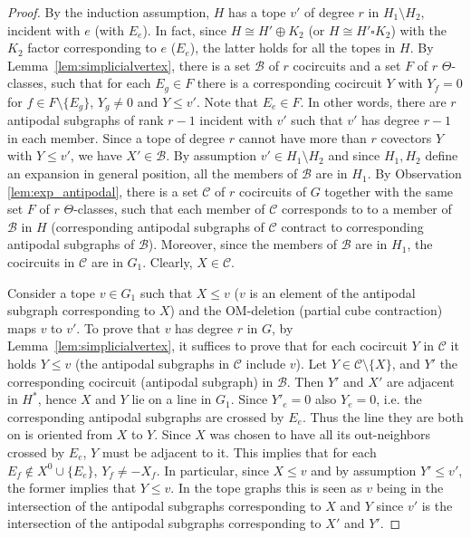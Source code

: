\documentclass[final,11pt]{article}
\begin{document}
\begin{proof}
By the induction assumption, $H$ has a tope $v'$ of degree $r$ in $H_1 \setminus H_2$, incident with $e$ (with $E_e$). In fact, since $H\cong H' \oplus K_2$ (or $H\cong H' \square K_2$) with the $K_2$ factor corresponding to $e$ ($E_e$), the latter holds for all the topes in $H$. By Lemma~\ref{lem:simplicialvertex}, there is a set $\mathcal{B}$ of $r$ cocircuits and a set $F$ of $r$ $\Theta$-classes, such that for each $E_g \in F$ there is a corresponding cocircuit $Y$ with $Y_f=0$ for $f \in F\setminus\{E_g\}$, $Y_g \neq 0$ and $Y \leq v'$. Note that $E_e \in F$. In other words, there are $r$ antipodal subgraphs of rank $r-1$ incident with $v'$ such that $v'$ has degree $r-1$ in each member. Since a tope of degree $r$ cannot have more than $r$ covectors $Y$ with $Y \leq v'$, we have $X'\in \mathcal{B}$. By assumption $v'\in H_1 \setminus H_2$  and since $H_1, H_2$ define an expansion in general position, all the members of $\mathcal{B}$ are in $H_1$. By Observation \ref{lem:exp_antipodal}, there is a set $\mathcal{C}$ of $r$ cocircuits of $G$ together with the same set $F$ of $r$ $\Theta$-classes, such that each member of $\mathcal{C}$ corresponds to to a member of $\mathcal{B}$ in $H$ (corresponding antipodal subgraphs of $\mathcal{C}$ contract to corresponding antipodal subgraphs of $\mathcal{B}$). Moreover, since the members of $\mathcal{B}$ are in $H_1$, the cocircuits in $\mathcal{C}$ are in $G_1$. Clearly, $X\in\mathcal{C}$. 

Consider a tope $v \in G_1$ such that $X\leq v$ ($v$ is an element of the antipodal subgraph corresponding to $X$) and the OM-deletion (partial cube contraction) maps $v$ to $v'$. To prove that $v$ has degree $r$ in $G$, by Lemma~\ref{lem:simplicialvertex}, it suffices to prove that for each cocircuit $Y$ in $\mathcal{C}$ it holds $ Y\leq v$ (the antipodal subgraphs in $\mathcal{C}$ include $v$). Let $Y \in  \mathcal{C}\setminus \{X\}$, and $Y'$ the corresponding cocircuit (antipodal subgraph) in $\mathcal{B}$. Then $Y'$ and $X'$ are adjacent in $H^*$, hence $X$ and $Y$ lie on a line in $G_1$. Since $Y'_e= 0$ also $Y_e=0$, i.e. the corresponding antipodal subgraphs are crossed by $E_e$. Thus the line they are both on is oriented from $X$ to $Y$. Since $X$ was chosen to have all its out-neighbors crossed by $E_e$, $Y$ must be adjacent to it. This implies that for each $E_f \notin X^0 \cup \{E_e\}$, $Y_f \neq -X_f$. In particular, since $X \leq v$ and by assumption $Y' \leq v'$, the former implies that $Y \leq v$. In the tope graphs this is seen as $v$ being in the intersection of the antipodal subgraphs corresponding to $X$ and $Y$ since $v'$ is the intersection of the antipodal subgraphs corresponding to $X'$ and $Y'$. 




\end{proof}
\end{document}
